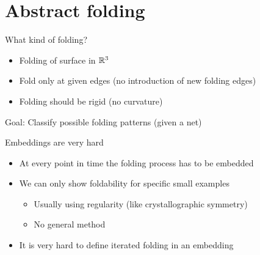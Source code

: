 \section{Abstract folding}
\frame{\tableofcontents[currentsection]}

\begin{frame}{What kind of folding?}
    \begin{itemize}
        \pause
        \item Folding of surface in $\mathbb{R}^3$
        \pause
        \item Fold only at given edges (no introduction of new folding edges)
        \pause
        \item Folding should be rigid (no curvature)
    \end{itemize}

    \pause
    Goal: Classify possible folding patterns (given a net)

    \pause
    \begin{center}
    \end{center}

\end{frame}


\begin{frame}{Embeddings are very hard}
    \begin{itemize}
        \item<2-> At every point in time the folding process has to be embedded
        \item<3-> We can only show foldability for specific small examples
            \begin{itemize}
                \item<4-> Usually using regularity (like crystallographic symmetry)
                \item<5-> No general method
            \end{itemize}
        \item<6-> It is very hard to define iterated folding in an embedding
    \end{itemize}

    \begin{center}
    \end{center}

\end{frame}


